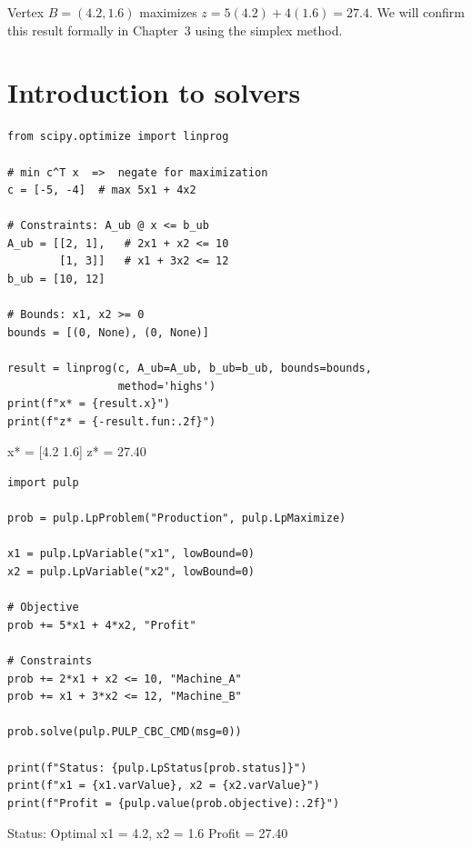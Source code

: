 Vertex $B = (4.2, 1.6)$ maximizes $z = 5(4.2) + 4(1.6) = 27.4$.
We will confirm this result formally in Chapter~3 using the simplex method.

\section{Introduction to solvers}

\begin{codeblock}[title=\textbf{Solving with SciPy}]
\begin{verbatim}
from scipy.optimize import linprog

# min c^T x  =>  negate for maximization
c = [-5, -4]  # max 5x1 + 4x2

# Constraints: A_ub @ x <= b_ub
A_ub = [[2, 1],   # 2x1 + x2 <= 10
        [1, 3]]   # x1 + 3x2 <= 12
b_ub = [10, 12]

# Bounds: x1, x2 >= 0
bounds = [(0, None), (0, None)]

result = linprog(c, A_ub=A_ub, b_ub=b_ub, bounds=bounds,
                 method='highs')
print(f"x* = {result.x}")
print(f"z* = {-result.fun:.2f}")
\end{verbatim}
\end{codeblock}

\begin{codeoutput}
x* = [4.2 1.6]
z* = 27.40
\end{codeoutput}

\begin{codeblock}[title=\textbf{Solving with PuLP}]
\begin{verbatim}
import pulp

prob = pulp.LpProblem("Production", pulp.LpMaximize)

x1 = pulp.LpVariable("x1", lowBound=0)
x2 = pulp.LpVariable("x2", lowBound=0)

# Objective
prob += 5*x1 + 4*x2, "Profit"

# Constraints
prob += 2*x1 + x2 <= 10, "Machine_A"
prob += x1 + 3*x2 <= 12, "Machine_B"

prob.solve(pulp.PULP_CBC_CMD(msg=0))

print(f"Status: {pulp.LpStatus[prob.status]}")
print(f"x1 = {x1.varValue}, x2 = {x2.varValue}")
print(f"Profit = {pulp.value(prob.objective):.2f}")
\end{verbatim}
\end{codeblock}

\begin{codeoutput}
Status: Optimal
x1 = 4.2, x2 = 1.6
Profit = 27.40
\end{codeoutput}

